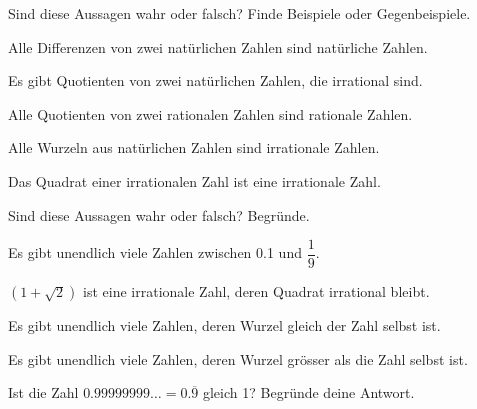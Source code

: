 \documentclass[%
11pt,%
twoside,%
titlepage,%
german,%
headsepline%
]{scrartcl}
\begin{document}
\begin{ueb}
Sind diese Aussagen wahr oder falsch? Finde Beispiele oder Gegenbeispiele.
\begin{enumeratea}
	\item Alle Differenzen von zwei natürlichen Zahlen sind natürliche Zahlen.
	\item Es gibt Quotienten von zwei natürlichen Zahlen, die irrational sind.
	\item Alle Quotienten von zwei rationalen Zahlen sind rationale Zahlen.
	\item Alle Wurzeln aus natürlichen Zahlen sind irrationale Zahlen.
    \item Das Quadrat einer irrationalen Zahl ist eine irrationale Zahl.
\end{enumeratea}
\end{ueb}

\begin{ueb}
Sind diese Aussagen wahr oder falsch? Begründe.
	\begin{enumeratea}
		\item Es gibt unendlich viele Zahlen zwischen 0.1 und $\dfrac{1}{9}$.
		\item $(1+\sqrt{2})$ ist eine irrationale Zahl, deren Quadrat irrational bleibt.
		\item Es gibt unendlich viele Zahlen, deren Wurzel gleich der Zahl selbst ist.
		\item Es gibt unendlich viele Zahlen, deren Wurzel grösser als die Zahl selbst ist.
	\end{enumeratea}
\end{ueb}

\begin{ueb}[$0.9999\dots$]
Ist die Zahl $0.99999999\dots = 0.\overline{9}$ gleich 1? Begründe deine Antwort.
\end{ueb}
\end{document}

